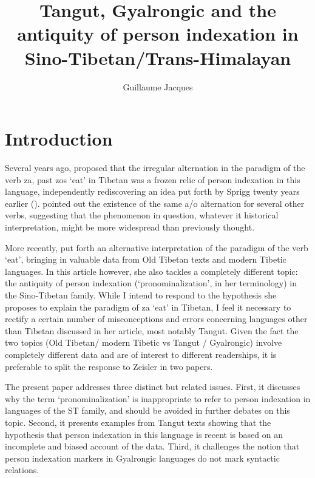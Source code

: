 \documentclass[oldfontcommands,oneside,a4paper,11pt]{article}
\newcommand{\ipa}[1]{{\phon \mbox{#1}}} %
\begin{document}
 
\title{Tangut, Gyalrongic and the antiquity of person indexation in Sino-Tibetan/Trans-Himalayan}
\author{Guillaume Jacques}
\maketitle
\linenumbers

\section{Introduction}
Several years ago, \citet{jacques10zos} proposed that the irregular alternation in the paradigm of the verb \ipa{za}, past \ipa{zos} `eat' in Tibetan was a frozen relic of person indexation in this language, independently rediscovering an idea put forth by Sprigg twenty years earlier (\citealt{driem11TB}). \citet{hill14derivational} pointed out the existence of  the same \ipa{a}/\ipa{o} alternation for several other verbs, suggesting that the phenomenon in question, whatever it historical interpretation, might be more widespread than previously thought. 


More recently, \citet{zeisler15eat} put forth an alternative interpretation of the paradigm of the verb `eat', bringing in valuable data from Old Tibetan texts and modern Tibetic languages. In this article however, she also tackles a completely different topic: the antiquity of person indexation (`pronominalization', in her terminology) in the Sino-Tibetan family. While I intend to respond to the hypothesis she proposes to explain the paradigm of \ipa{za} `eat' in Tibetan, I feel it necessary to rectify a certain number of misconceptions and errors concerning languages other than Tibetan discussed in her article, most notably Tangut. Given the fact the two topics (Old Tibetan/ modern Tibetic vs Tangut / Gyalrongic) involve completely different data and are of interest to different readerships, it is preferable to split the response to Zeisler in two papers.

The present paper addresses three distinct but related issues. First, it discusses why the term `pronominalization' is inappropriate to refer to  person indexation in languages of the ST family, and should be avoided in further debates on this topic. Second, it presents examples from Tangut texts showing that the hypothesis that person indexation in this language is recent is based on an incomplete and biased account of the data. Third, it challenges the notion that person indexation markers in Gyalrongic languages do not mark syntactic relations.
\end{document}
